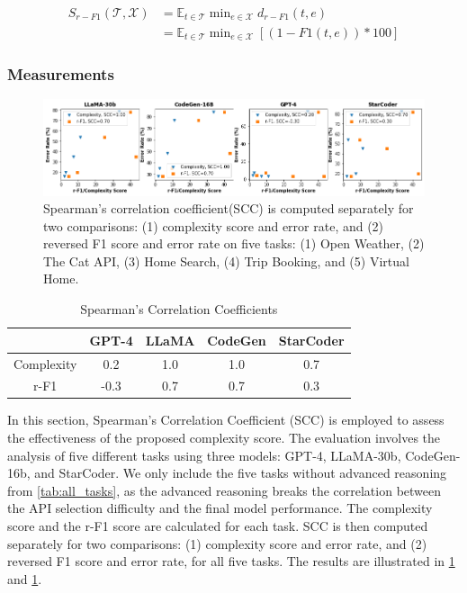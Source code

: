 \begin{equation}
\begin{aligned}
    S_{r-F1}(\mathcal{T}, \mathcal{X}) &= \mathbb{E}_{t \in \mathcal{T}}\min\nolimits_{e \in \mathcal{X}} d_{r-F1}(t, e) \\
    &= \mathbb{E}_{t \in \mathcal{T}}\min\nolimits_{e \in \mathcal{X}}\left[(1-F1(t,e)) *100\right]
\end{aligned}
\end{equation}

\subsubsection{Measurements}

\begin{figure}
    \caption{Spearman's correlation coefficient(SCC) is computed separately for two comparisons: (1) complexity score and error rate, and (2) reversed F1 score and error rate on five tasks: (1) Open Weather, (2) The Cat API, (3) Home Search, (4) Trip Booking, and (5) Virtual Home. }\label{fig:scc}
    \includegraphics[width=\textwidth]{plots/scc.png}
\end{figure}

\begin{table}
\vspace{-12pt}
    \centering
    \caption{Spearman’s Correlation Coefficients}
    \begin{tabular}{ccccc}
        \toprule
        & GPT-4 & LLaMA & CodeGen & StarCoder  \\
        \midrule
        Complexity & 0.2 & 1.0 & 1.0 & 0.7 \\
        r-F1 & -0.3 & 0.7 & 0.7 & 0.3 \\
        \bottomrule
    \end{tabular}
    \label{table:scc}
\end{table}
In this section, Spearman's Correlation Coefficient (SCC) \cite{hauke2011comparison} is employed to assess the effectiveness of the proposed complexity score. The evaluation involves the analysis of five different tasks using three models: GPT-4, LLaMA-30b, CodeGen-16b, and StarCoder. We only include the five tasks without advanced reasoning from \cref{tab:all_tasks}, as the advanced reasoning breaks the correlation between the API selection difficulty and the final model performance. The complexity score and the r-F1 score are calculated for each task. SCC is then computed separately for two comparisons: (1) complexity score and error rate, and (2) reversed F1 score and error rate, for all five tasks. The results are illustrated in \cref{fig:scc} and \cref{table:scc}.

